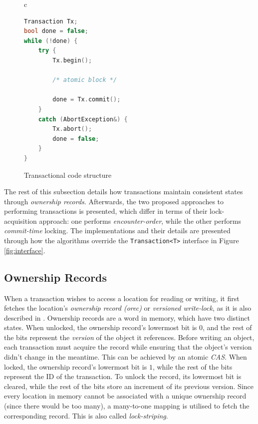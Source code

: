 \begin{figure}[!htb]
\centering
\begin{tabular}{c}
\begin{lstlisting}[language=C++]
Transaction Tx;
bool done = false;
while (!done) {
    try {
        Tx.begin();
        
        /* atomic block */
        
        done = Tx.commit();
    }
    catch (AbortException&) {
        Tx.abort();
        done = false;
    }
}
\end{lstlisting}
\end{tabular}
\caption{Transactional code structure}
\label{code-structure}
\end{figure}

The rest of this subsection details how transactions maintain consistent states through \textit{ownership records}. Afterwards, the two proposed approaches to performing transactions is presented, which differ in terms of their lock-acquisition approach: one performs \textit{encounter-order}, while the other performs \textit{commit-time} locking. The implementations and their details are presented through how the algorithms override the \texttt{Transaction<T>} interface in Figure \ref{fig:interface}.

\subsection{Ownership Records}
When a transaction wishes to access a location for reading or writing, it first fetches the location's \textit{ownership record (orec)} or \textit{versioned write-lock}, as it is also described in \cite{tl, tl2, book}. Ownership records are a word in memory, which have two distinct states. When unlocked, the ownership record's lowermost bit is $0$, and the rest of the bits represent the \textit{version} of the object it references. Before writing an object, each transaction must acquire the record while ensuring that the object's version didn't change in the meantime. This can be achieved by an atomic \textit{CAS}. When locked, the ownership record's lowermost bit is $1$, while the rest of the bits represent the ID of the transaction. To unlock the record, its lowermost bit is cleared, while the rest of the bits store an increment of its previous version. Since every location in memory cannot be associated with a unique ownership record (since there would be too many), a many-to-one mapping is utilised to fetch the corresponding record. This is also called \textit{lock-striping}\cite{tl, tl2}.

